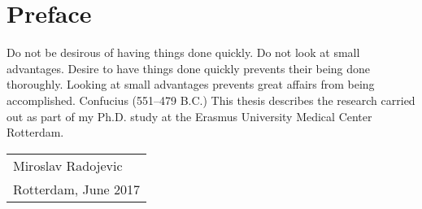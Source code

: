 %
%

\noquote
\chpos{14mm}{11mm}
\chapter*{Preface}

\mysquote{\textwidth}
{Do not be desirous of having things done quickly. Do not look at small advantages. Desire to have things done quickly prevents their being done thoroughly. Looking at small advantages prevents great affairs from being accomplished.}
{Confucius (551--479 B.C.)}
This thesis describes the research carried out as part of my Ph.D. study at the Erasmus University Medical Center Rotterdam. 
\bigskip
\begin{flushright}
  \begin{tabular}{@{}l@{}}
    Miroslav Radojevic\\
    Rotterdam, June 2017
  \end{tabular}
\end{flushright}

